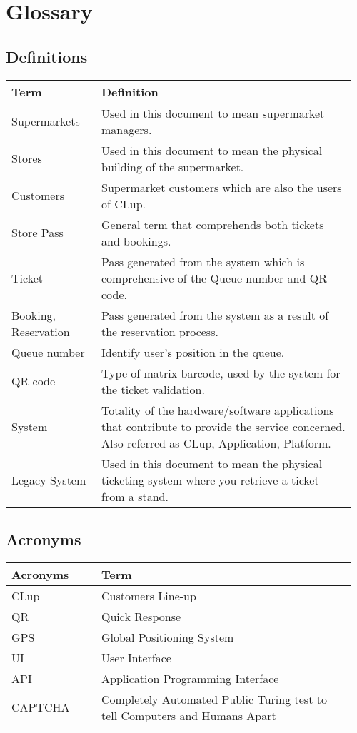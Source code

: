 \section{Glossary}
\subsection{Definitions}
\begin{center}
	\begin{tabular}{@{}p{0.25\linewidth} p{0.71\linewidth}@{}}
		\toprule
		\textbf{Term} & \textbf{Definition}\\
		\midrule
		Supermarkets & Used in this document to mean supermarket managers.\\
		Stores & Used in this document to mean the physical building of the supermarket.\\
		Customers & Supermarket customers which are also the users of CLup.\\
		Store Pass & General term that comprehends both tickets and bookings.\\
		Ticket & Pass generated from the system which is comprehensive of the Queue number and QR code.\\
		Booking, Reservation & Pass generated from the system as a result of the reservation process.\\
		Queue number & Identify user's position in the queue.\\
		QR code & Type of matrix barcode, used by the system for the ticket validation.\\
		System & Totality of the hardware/software applications that contribute to provide the service concerned. Also referred as CLup, Application, Platform.\\
		Legacy System & Used in this document to mean the physical ticketing system where you retrieve a ticket from a stand.\\
		\bottomrule
	\end{tabular}
\end{center}

\subsection{Acronyms}
\begin{center}
	\begin{tabular}{@{}p{0.25\linewidth} p{0.71\linewidth}@{}}
		\toprule
		\textbf{Acronyms} & \textbf{Term}\\
		\midrule
		CLup & Customers Line-up\\
		QR & Quick Response\\
		GPS & Global Positioning System\\
		UI & User Interface\\
		API & Application Programming Interface\\
		CAPTCHA & Completely Automated Public Turing test to tell Computers and Humans Apart\\
		\bottomrule
	\end{tabular}
\end{center}

